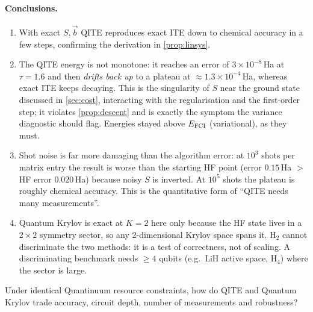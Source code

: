 \documentclass[11pt,a4paper]{article}
\begin{document}
\paragraph{Conclusions.}
\begin{enumerate}
\item With exact $S,\vec b$ QITE reproduces exact ITE down to chemical accuracy in a few steps,
confirming the derivation in \cref{prop:linsys}.
\item The QITE energy is \alert{not monotone}: it reaches an error of $3\times10^{-8}$\,Ha at $\tau=1.6$ and then
\emph{drifts back up} to a plateau at $\approx1.3\times10^{-4}$\,Ha, whereas exact ITE keeps decaying. This is
the singularity of $S$ near the ground state discussed in \cref{sec:cost}, interacting with the
regularisation and the first-order step; it violates \cref{prop:descent} and is exactly the symptom the
variance diagnostic should flag. Energies stayed above $E_{\rm FCI}$ (variational), as they must.
\item Shot noise is far more damaging than the algorithm error: at $10^3$ shots per matrix entry
the result is worse than the starting HF point (error $0.15$\,Ha $>$ HF error $0.020$\,Ha) because noisy
$S$ is inverted. At $10^5$ shots the plateau is roughly chemical accuracy. This is the quantitative
form of ``QITE needs many measurements''.
\item Quantum Krylov is exact at $K=2$ here only because the HF state lives in a $2\times2$ symmetry
sector, so any 2-dimensional Krylov space spans it. \alert{$\mathrm{H}_2$ cannot discriminate the two methods}:
it is a test of correctness, not of scaling. A discriminating benchmark needs $\ge4$ qubits
(e.g.\ $\mathrm{LiH}$ active space, $\mathrm{H}_4$) where the sector is large.
\end{enumerate}

\label{sec:bench}

\begin{question}
Under identical Quantinuum resource constraints, how do QITE and Quantum Krylov trade
accuracy, circuit depth, number of measurements and robustness?
\end{question}
\end{document}
